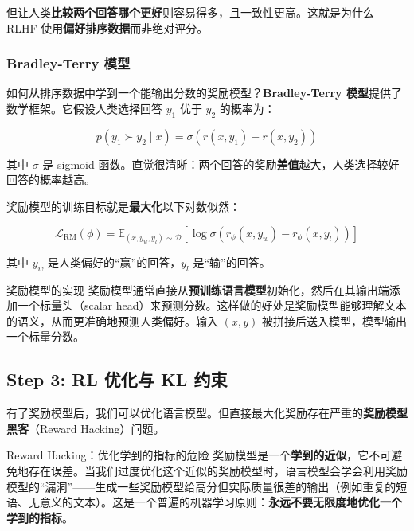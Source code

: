 \documentclass[a4paper]{article}
\begin{document}
但让人类\textbf{比较两个回答哪个更好}则容易得多，且一致性更高。这就是为什么 RLHF 使用\textbf{偏好排序数据}而非绝对评分。





\subsubsection{Bradley-Terry 模型}

如何从排序数据中学到一个能输出分数的奖励模型？\textbf{Bradley-Terry 模型}提供了数学框架。它假设人类选择回答 $y_1$ 优于 $y_2$ 的概率为：

$$p(y_1 \succ y_2 \mid x) = \sigma\left(r(x, y_1) - r(x, y_2)\right)$$

其中 $\sigma$ 是 sigmoid 函数。直觉很清晰：两个回答的奖励\textbf{差值}越大，人类选择较好回答的概率越高。





奖励模型的训练目标就是\textbf{最大化}以下对数似然：

$$\mathcal{L}_{\text{RM}}(\phi) = \mathbb{E}_{(x, y_w, y_l) \sim \mathcal{D}} \left[ \log \sigma\left(r_\phi(x, y_w) - r_\phi(x, y_l)\right) \right]$$

其中 $y_w$ 是人类偏好的``赢''的回答，$y_l$ 是``输''的回答。

\begin{importantbox}{奖励模型的实现}
奖励模型通常直接从\textbf{预训练语言模型}初始化，然后在其输出端添加一个标量头（scalar head）来预测分数。这样做的好处是奖励模型能够理解文本的语义，从而更准确地预测人类偏好。输入 $(x, y)$ 被拼接后送入模型，模型输出一个标量分数。
\end{importantbox}

\subsection{Step 3: RL 优化与 KL 约束}

有了奖励模型后，我们可以优化语言模型。但直接最大化奖励存在严重的\textbf{奖励模型黑客}（Reward Hacking）问题。





\begin{warningbox}{Reward Hacking：优化学到的指标的危险}
奖励模型是一个\textbf{学到的近似}，它不可避免地存在误差。当我们过度优化这个近似的奖励模型时，语言模型会学会利用奖励模型的``漏洞''——生成一些奖励模型给高分但实际质量很差的输出（例如重复的短语、无意义的文本）。这是一个普遍的机器学习原则：\textbf{永远不要无限度地优化一个学到的指标}。
\end{warningbox}
\end{document}
